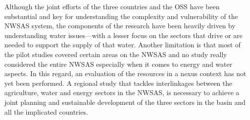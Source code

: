 Although the joint efforts of the three countries and the OSS have been substantial and key for understanding the complexity and vulnerability of the NWSAS system, the components of the research have been heavily driven by understanding water issues---with a lesser focus on the sectors that drive or are needed to support the supply of that water. Another limitation is that most of the pilot studies covered certain areas on the NWSAS and no study really considered the entire NWSAS especially when it comes to energy and water aspects. In this regard, an evaluation of the resources in a nexus context has not yet been performed. A regional study that tackles interlinkages between the agriculture, water and energy sectors in the NWSAS, is necessary to achieve a joint planning and sustainable development of the three sectors in the basin and all the implicated countries. 
\cite{gremillionWastewaterResourceWaterWasteEnergy}